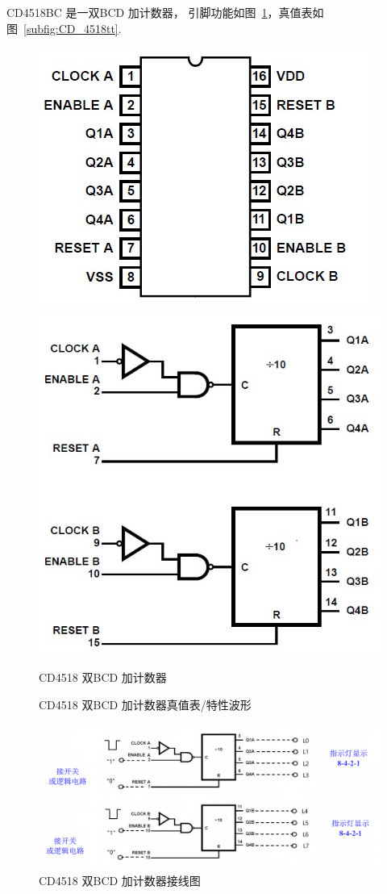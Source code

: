 \documentclass[11pt]{SEU-Digital-Report}
\begin{document}
    CD4518BC 是一双BCD 加计数器， 引脚功能如图~\ref{fig:CD4518_module}，真值表如图~\ref{subfig:CD_4518tt}. 

    \begin{figure}[htbp]
      \centering
      \includegraphics[width=.3\linewidth]{fig/CD4518_module1.jpg}
      \includegraphics[width=.3\linewidth]{fig/CD4518_module2.jpg}
      \caption{CD4518 双BCD 加计数器}
      \label{fig:CD4518_module}
    \end{figure}

    \begin{figure}[htbp]
      \centering
      \caption{CD4518 双BCD 加计数器真值表/特性波形}
    \end{figure}

    \begin{figure}[htbp]
      \centering
      \includegraphics[width=.6\linewidth]{fig/CD4518_.png}
      \caption{CD4518 双BCD 加计数器接线图}
      \label{fig:CD4518_}
    \end{figure}
\end{document}
